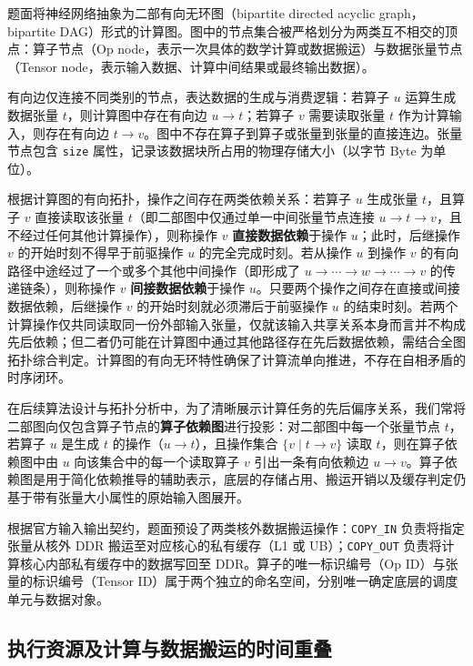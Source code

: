 \documentclass[anonymous,withtoc]{gmcm2026}
\begin{document}
题面将神经网络抽象为二部有向无环图（bipartite directed acyclic graph，bipartite DAG）形式的计算图。图中的节点集合被严格划分为两类互不相交的顶点：算子节点（Op node，表示一次具体的数学计算或数据搬运）与数据张量节点（Tensor node，表示输入数据、计算中间结果或最终输出数据）。

有向边仅连接不同类别的节点，表达数据的生成与消费逻辑：若算子 \(u\) 运算生成数据张量 \(t\)，则计算图中存在有向边 \(u \to t\)；若算子 \(v\) 需要读取张量 \(t\) 作为计算输入，则存在有向边 \(t \to v\)。图中不存在算子到算子或张量到张量的直接连边。张量节点包含 \texttt{size} 属性，记录该数据块所占用的物理存储大小（以字节 Byte 为单位）。

根据计算图的有向拓扑，操作之间存在两类依赖关系：若算子 \(u\) 生成张量 \(t\)，且算子 \(v\) 直接读取该张量 \(t\)（即二部图中仅通过单一中间张量节点连接 \(u \to t \to v\)，且不经过任何其他计算操作），则称操作 \(v\) \textbf{直接数据依赖}于操作 \(u\)；此时，后继操作 \(v\) 的开始时刻不得早于前驱操作 \(u\) 的完全完成时刻。若从操作 \(u\) 到操作 \(v\) 的有向路径中途经过了一个或多个其他中间操作（即形成了 \(u \to \cdots \to w \to \cdots \to v\) 的传递链条），则称操作 \(v\) \textbf{间接数据依赖}于操作 \(u\)。只要两个操作之间存在直接或间接数据依赖，后继操作 \(v\) 的开始时刻就必须滞后于前驱操作 \(u\) 的结束时刻。若两个计算操作仅共同读取同一份外部输入张量，仅就该输入共享关系本身而言并不构成先后依赖；但二者仍可能在计算图中通过其他路径存在先后数据依赖，需结合全图拓扑综合判定。计算图的有向无环特性确保了计算流单向推进，不存在自相矛盾的时序闭环。

在后续算法设计与拓扑分析中，为了清晰展示计算任务的先后偏序关系，我们常将二部图向仅包含算子节点的\textbf{算子依赖图}进行投影：对二部图中每一个张量节点 \(t\)，若算子 \(u\) 是生成 \(t\) 的操作（\(u \to t\)），且操作集合 \(\{v \mid t \to v\}\) 读取 \(t\)，则在算子依赖图中由 \(u\) 向该集合中的每一个读取算子 \(v\) 引出一条有向依赖边 \(u \to v\)。算子依赖图是用于简化依赖推导的辅助表示，底层的存储占用、搬运开销以及缓存判定仍基于带有张量大小属性的原始输入图展开。

根据官方输入输出契约，题面预设了两类核外数据搬运操作：\texttt{COPY\_IN} 负责将指定张量从核外 DDR 搬运至对应核心的私有缓存（L1 或 UB）；\texttt{COPY\_OUT} 负责将计算核心内部私有缓存中的数据写回至 DDR。算子的唯一标识编号（Op ID）与张量的标识编号（Tensor ID）属于两个独立的命名空间，分别唯一确定底层的调度单元与数据对象。

\subsection{执行资源及计算与数据搬运的时间重叠}
\end{document}

